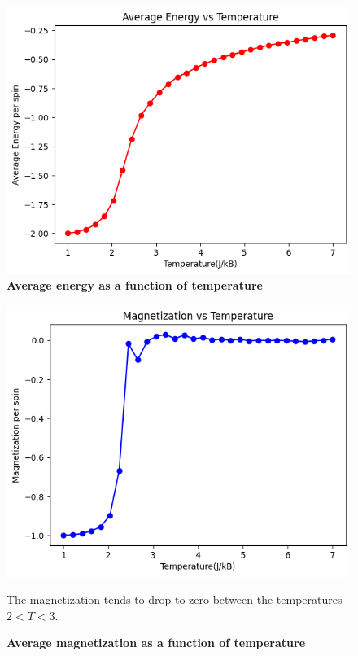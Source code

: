 \documentclass{article}
\begin{document}
\begin{figure}[h]
    \centering
    \includegraphics[scale=0.8]{avgenergyvstemp.png}
    \caption{\textbf{Average energy as a function of temperature}}
    \label{fig:avg_energy_vs_temp}
\end{figure}

\begin{figure}[h]
    \centering
    \includegraphics[scale=0.7]{magnetizationvstemp.png}
    \caption{\textbf{Average magnetization as a function of temperature}}
    \label{fig:avg_magnetization_vs_temp}
The magnetization tends to drop to zero between the temperatures $2 < T < 3$.
\end{figure}
\end{document}
